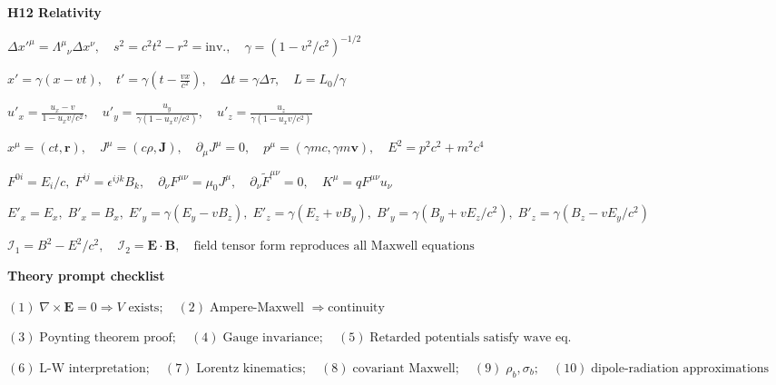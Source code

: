 \documentclass[a4paper]{article}
\newcommand{\E}{\mathbf{E}}
\newcommand{\B}{\mathbf{B}}
\newcommand{\J}{\mathbf{J}}
\newcommand{\wt}{\widetilde}
\newcommand{\secblock}[1]{\vspace{0.08ex}\textbf{#1}\par}
\newcommand{\eqline}[1]{\(#1\)\par}
\begin{document}
\begin{multicols*}{6}
\secblock{H12 Relativity}
\eqline{\Delta x'^\mu=\Lambda^\mu{}_{\nu}\Delta x^\nu,
 \quad s^2=c^2t^2-r^2=\text{inv.},
 \quad \gamma=(1-v^2/c^2)^{-1/2}}
\eqline{x'=\gamma(x-vt),\quad t'=\gamma\left(t-\frac{vx}{c^2}\right),
 \quad \Delta t=\gamma\Delta\tau,
 \quad L=L_0/\gamma}
\eqline{u'_x=\frac{u_x-v}{1-u_xv/c^2},
 \quad u'_y=\frac{u_y}{\gamma(1-u_xv/c^2)},
 \quad u'_z=\frac{u_z}{\gamma(1-u_xv/c^2)}}
\eqline{x^\mu=(ct,\mathbf r),\quad J^\mu=(c\rho,\J),
 \quad \partial_\mu J^\mu=0,
 \quad p^\mu=(\gamma mc,\gamma m\mathbf v),
 \quad E^2=p^2c^2+m^2c^4}
\eqline{F^{0i}=E_i/c,\;F^{ij}=\epsilon^{ijk}B_k,
 \quad \partial_\nu F^{\mu\nu}=\mu_0J^\mu,
 \quad \partial_\nu\wt F^{\mu\nu}=0,
 \quad K^\mu=qF^{\mu\nu}u_\nu}
\eqline{E'_x=E_x,\;B'_x=B_x,
 \;E'_y=\gamma(E_y-vB_z),
 \;E'_z=\gamma(E_z+vB_y),
 \;B'_y=\gamma(B_y+vE_z/c^2),
 \;B'_z=\gamma(B_z-vE_y/c^2)}
\eqline{\mathcal I_1=B^2-E^2/c^2,
 \quad \mathcal I_2=\E\cdot\B,
 \quad \text{field tensor form reproduces all Maxwell equations}}

\secblock{Theory prompt checklist}
\eqline{(1)\;\nabla\times\E=0\Rightarrow V\text{ exists};
 \quad (2)\;\text{Ampere-Maxwell }\Rightarrow\text{continuity}}
\eqline{(3)\;\text{Poynting theorem proof};
 \quad (4)\;\text{Gauge invariance};
 \quad (5)\;\text{Retarded potentials satisfy wave eq.}}
\eqline{(6)\;\text{L-W interpretation};
 \quad (7)\;\text{Lorentz kinematics};
 \quad (8)\;\text{covariant Maxwell};
 \quad (9)\;\rho_b,\sigma_b;
 \quad (10)\;\text{dipole-radiation approximations}}

\end{multicols*}
\end{document}

